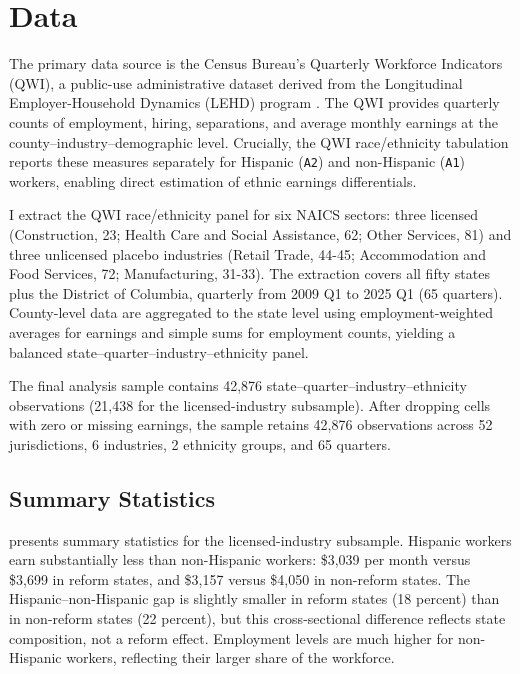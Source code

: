 \documentclass[12pt]{article}
\begin{document}
\section{Data}

The primary data source is the Census Bureau's Quarterly Workforce Indicators (QWI), a public-use administrative dataset derived from the Longitudinal Employer-Household Dynamics (LEHD) program \citep{abowd2009lehd}. The QWI provides quarterly counts of employment, hiring, separations, and average monthly earnings at the county--industry--demographic level. Crucially, the QWI race/ethnicity tabulation reports these measures separately for Hispanic (\texttt{A2}) and non-Hispanic (\texttt{A1}) workers, enabling direct estimation of ethnic earnings differentials.

I extract the QWI race/ethnicity panel for six NAICS sectors: three licensed (Construction, 23; Health Care and Social Assistance, 62; Other Services, 81) and three unlicensed placebo industries (Retail Trade, 44-45; Accommodation and Food Services, 72; Manufacturing, 31-33). The extraction covers all fifty states plus the District of Columbia, quarterly from 2009 Q1 to 2025 Q1 (65 quarters). County-level data are aggregated to the state level using employment-weighted averages for earnings and simple sums for employment counts, yielding a balanced state--quarter--industry--ethnicity panel.

The final analysis sample contains 42,876 state--quarter--industry--ethnicity observations (21,438 for the licensed-industry subsample). After dropping cells with zero or missing earnings, the sample retains 42,876 observations across 52 jurisdictions, 6 industries, 2 ethnicity groups, and 65 quarters.

\subsection{Summary Statistics}



 presents summary statistics for the licensed-industry subsample. Hispanic workers earn substantially less than non-Hispanic workers: \$3,039 per month versus \$3,699 in reform states, and \$3,157 versus \$4,050 in non-reform states. The Hispanic--non-Hispanic gap is slightly smaller in reform states (18 percent) than in non-reform states (22 percent), but this cross-sectional difference reflects state composition, not a reform effect. Employment levels are much higher for non-Hispanic workers, reflecting their larger share of the workforce.
\end{document}
